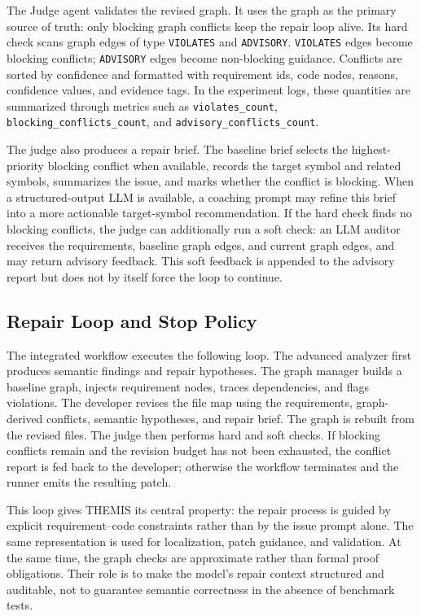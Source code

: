 \documentclass[11pt]{article}
\begin{document}
The Judge agent validates the revised graph.  It uses the graph as the primary source of truth: only blocking graph conflicts keep the repair loop alive.  Its hard check scans graph edges of type \texttt{VIOLATES} and \texttt{ADVISORY}.  \texttt{VIOLATES} edges become blocking conflicts; \texttt{ADVISORY} edges become non-blocking guidance.  Conflicts are sorted by confidence and formatted with requirement ids, code nodes, reasons, confidence values, and evidence tags.  In the experiment logs, these quantities are summarized through metrics such as \texttt{violates\_count}, \texttt{blocking\_conflicts\_count}, and \texttt{advisory\_conflicts\_count}.

The judge also produces a repair brief.  The baseline brief selects the highest-priority blocking conflict when available, records the target symbol and related symbols, summarizes the issue, and marks whether the conflict is blocking.  When a structured-output LLM is available, a coaching prompt may refine this brief into a more actionable target-symbol recommendation.  If the hard check finds no blocking conflicts, the judge can additionally run a soft check: an LLM auditor receives the requirements, baseline graph edges, and current graph edges, and may return advisory feedback.  This soft feedback is appended to the advisory report but does not by itself force the loop to continue.

\subsection{Repair Loop and Stop Policy}
\label{subsec:repair-loop}

The integrated workflow executes the following loop.  The advanced analyzer first produces semantic findings and repair hypotheses.  The graph manager builds a baseline graph, injects requirement nodes, traces dependencies, and flags violations.  The developer revises the file map using the requirements, graph-derived conflicts, semantic hypotheses, and repair brief.  The graph is rebuilt from the revised files.  The judge then performs hard and soft checks.  If blocking conflicts remain and the revision budget has not been exhausted, the conflict report is fed back to the developer; otherwise the workflow terminates and the runner emits the resulting patch.

This loop gives THEMIS its central property: the repair process is guided by explicit requirement--code constraints rather than by the issue prompt alone.  The same representation is used for localization, patch guidance, and validation.  At the same time, the graph checks are approximate rather than formal proof obligations.  Their role is to make the model's repair context structured and auditable, not to guarantee semantic correctness in the absence of benchmark tests.
\end{document}
